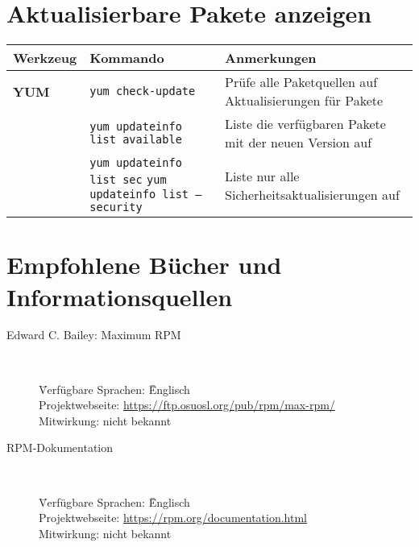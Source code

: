 \documentclass[10pt,a4paper]{article}
\begin{document}
\section{Aktualisierbare Pakete anzeigen}
\begin{tabular}{ p{3.5cm} p{9cm} p{11cm}}
  \hline
  \rowcolor{Gray}
  \textbf{Werkzeug} & \textbf{Kommando} & \textbf{Anmerkungen} \\
  \hline 
  \textbf{YUM} & \texttt{yum check-update} & Prüfe alle Paketquellen auf Aktualisierungen für Pakete \\
  \rowcolor{Gray}
  & \texttt{yum updateinfo list available} & Liste die verfügbaren Pakete mit der neuen Version auf \\
  & \texttt{yum updateinfo list sec} \newline \texttt{yum updateinfo list --security} & Liste nur alle Sicherheitsaktualisierungen auf \\
  \hline
\end{tabular}

\section{Empfohlene Bücher und Informationsquellen}

\begin{description}

    \item[Edward C. Bailey: Maximum RPM] ~ \\
        \begin{tabbing}
            \= Verfügbare Sprachen: \= \= Englisch \\
            \> Projektwebseite: \> \> \href{https://ftp.osuosl.org/pub/rpm/max-rpm/}{https://ftp.osuosl.org/pub/rpm/max-rpm/} \\
            \> Mitwirkung: \> \> nicht bekannt \\
        \end{tabbing}
        
    \item[RPM-Dokumentation] ~ \\
        \begin{tabbing}
            \= Verfügbare Sprachen: \= \= Englisch \\
            \> Projektwebseite: \> \> \href{https://rpm.org/documentation.html}{https://rpm.org/documentation.html} \\
            \> Mitwirkung: \> \> nicht bekannt \\
        \end{tabbing}
    \end{description}
\end{document}
